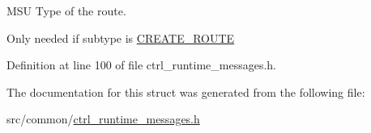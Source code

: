 M\-S\-U Type of the route. 

Only needed if subtype is \hyperlink{ctrl__runtime__messages_8h_ad951c7380db78ed80db2c2484eb7daa8af3b7ba89a90883322a996a4955044b0a}{C\-R\-E\-A\-T\-E\-\_\-\-R\-O\-U\-T\-E} 

Definition at line 100 of file ctrl\-\_\-runtime\-\_\-messages.\-h.



The documentation for this struct was generated from the following file\-:\begin{DoxyCompactItemize}
\item 
src/common/\hyperlink{ctrl__runtime__messages_8h}{ctrl\-\_\-runtime\-\_\-messages.\-h}\end{DoxyCompactItemize}
